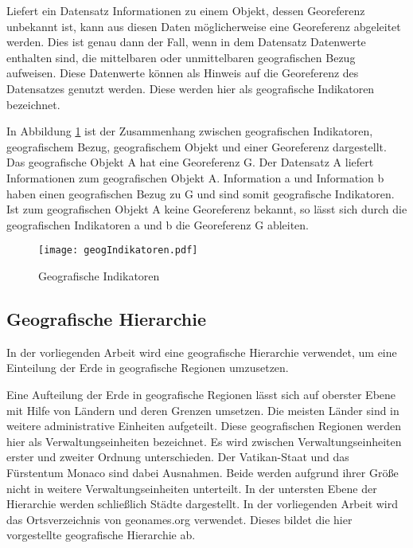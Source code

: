 			Liefert ein Datensatz Informationen zu einem Objekt, dessen Georeferenz unbekannt ist, kann aus diesen Daten möglicherweise eine Georeferenz abgeleitet werden. 
			Dies ist genau dann der Fall, wenn in dem Datensatz Datenwerte enthalten sind, die mittelbaren oder unmittelbaren geografischen Bezug aufweisen.
			Diese Datenwerte können als Hinweis auf die Georeferenz des Datensatzes genutzt werden.
			Diese werden hier als geografische Indikatoren bezeichnet.

			In Abbildung \ref{img:geogIndi} ist der Zusammenhang zwischen geografischen Indikatoren, geografischem Bezug, geografischem Objekt und einer Georeferenz dargestellt. 
			Das geografische Objekt A hat eine Georeferenz G.
			Der Datensatz A liefert Informationen zum geografischen Objekt A.
			Information a und Information b haben einen geografischen Bezug zu G und sind somit geografische Indikatoren.
			Ist zum geografischen Objekt A keine Georeferenz bekannt, so lässt sich durch die geografischen Indikatoren a und b die Georeferenz G ableiten. 

			\begin{figure}[h!]
			\begin{center}
				\texttt{[image: geogIndikatoren.pdf]}
				\caption{Geografische Indikatoren}
				\label{img:geogIndi}
			\end{center}
			\end{figure}	

		\subsection{Geografische Hierarchie} \label{sub:geografischeHierarchie} 
			
			In der vorliegenden Arbeit wird eine geografische Hierarchie verwendet, um eine Einteilung der Erde in geografische Regionen umzusetzen.

			Eine Aufteilung der Erde in geografische Regionen lässt sich auf oberster Ebene mit Hilfe von Ländern und deren Grenzen umsetzen. 
			Die meisten Länder sind in weitere administrative Einheiten aufgeteilt.
			Diese geografischen Regionen werden hier als Verwaltungseinheiten bezeichnet.
			Es wird zwischen Verwaltungseinheiten erster und zweiter Ordnung unterschieden. 
			Der Vatikan-Staat und das Fürstentum Monaco sind dabei Ausnahmen.
			Beide werden aufgrund ihrer Größe nicht in weitere Verwaltungseinheiten unterteilt.
			In der untersten Ebene der Hierarchie werden schließlich Städte dargestellt.
			In der vorliegenden Arbeit wird das Ortsverzeichnis von geonames.org verwendet. 
			Dieses bildet die hier vorgestellte geografische Hierarchie ab.


